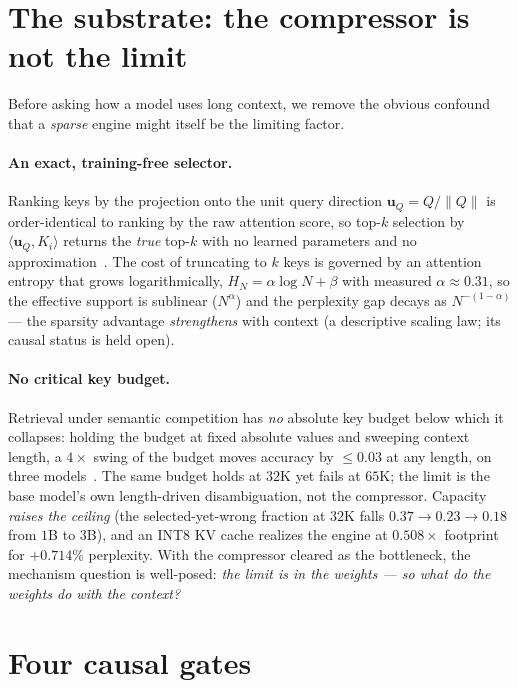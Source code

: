 \documentclass[11pt]{article}
\begin{document}
\section{The substrate: the compressor is not the limit}
\label{sec:engine}

Before asking how a model uses long context, we remove the obvious confound that a
\emph{sparse} engine might itself be the limiting factor.

\paragraph{An exact, training-free selector.} Ranking keys by the projection onto the
unit query direction $\mathbf{u}_Q=Q/\lVert Q\rVert$ is order-identical to ranking by
the raw attention score, so top-$k$ selection by $\langle\mathbf{u}_Q,K_i\rangle$
returns the \emph{true} top-$k$ with no learned parameters and no
approximation~\cite{paper2qaxis}. The cost of truncating to $k$ keys is governed by an
attention entropy that grows logarithmically, $H_N=\alpha\log N+\beta$ with measured
$\alpha\approx0.31$, so the effective support is sublinear ($N^{\alpha}$) and the
perplexity gap decays as $N^{-(1-\alpha)}$ --- the sparsity advantage \emph{strengthens}
with context (a descriptive scaling law; its causal status is held open).

\paragraph{No critical key budget.} Retrieval under semantic competition has \emph{no}
absolute key budget below which it collapses: holding the budget at fixed absolute
values and sweeping context length, a $4\times$ swing of the budget moves accuracy by
$\le0.03$ at any length, on three models~\cite{paper3retention}. The same budget holds
at $32$K yet fails at $65$K; the limit is the base model's own length-driven
disambiguation, not the compressor. Capacity \emph{raises the ceiling} (the
selected-yet-wrong fraction at $32$K falls $0.37\!\to\!0.23\!\to\!0.18$ from $1$B to
$3$B), and an INT8 KV cache realizes the engine at $0.508\times$ footprint for
$+0.714\%$ perplexity. With the compressor cleared as the bottleneck, the mechanism
question is well-posed: \emph{the limit is in the weights --- so what do the weights do
with the context?}

\section{Four causal gates}
\label{sec:gates}
\end{document}
